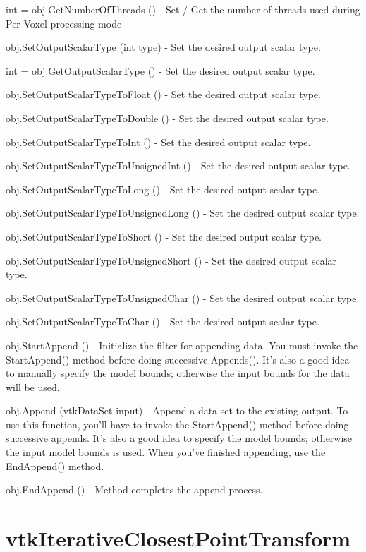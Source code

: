 \begin{DoxyItemize}
\item {\ttfamily int = obj.\-Get\-Number\-Of\-Threads ()} -\/ Set / Get the number of threads used during Per-\/\-Voxel processing mode  
\item {\ttfamily obj.\-Set\-Output\-Scalar\-Type (int type)} -\/ Set the desired output scalar type.  
\item {\ttfamily int = obj.\-Get\-Output\-Scalar\-Type ()} -\/ Set the desired output scalar type.  
\item {\ttfamily obj.\-Set\-Output\-Scalar\-Type\-To\-Float ()} -\/ Set the desired output scalar type.  
\item {\ttfamily obj.\-Set\-Output\-Scalar\-Type\-To\-Double ()} -\/ Set the desired output scalar type.  
\item {\ttfamily obj.\-Set\-Output\-Scalar\-Type\-To\-Int ()} -\/ Set the desired output scalar type.  
\item {\ttfamily obj.\-Set\-Output\-Scalar\-Type\-To\-Unsigned\-Int ()} -\/ Set the desired output scalar type.  
\item {\ttfamily obj.\-Set\-Output\-Scalar\-Type\-To\-Long ()} -\/ Set the desired output scalar type.  
\item {\ttfamily obj.\-Set\-Output\-Scalar\-Type\-To\-Unsigned\-Long ()} -\/ Set the desired output scalar type.  
\item {\ttfamily obj.\-Set\-Output\-Scalar\-Type\-To\-Short ()} -\/ Set the desired output scalar type.  
\item {\ttfamily obj.\-Set\-Output\-Scalar\-Type\-To\-Unsigned\-Short ()} -\/ Set the desired output scalar type.  
\item {\ttfamily obj.\-Set\-Output\-Scalar\-Type\-To\-Unsigned\-Char ()} -\/ Set the desired output scalar type.  
\item {\ttfamily obj.\-Set\-Output\-Scalar\-Type\-To\-Char ()} -\/ Set the desired output scalar type.  
\item {\ttfamily obj.\-Start\-Append ()} -\/ Initialize the filter for appending data. You must invoke the Start\-Append() method before doing successive Appends(). It's also a good idea to manually specify the model bounds; otherwise the input bounds for the data will be used.  
\item {\ttfamily obj.\-Append (vtk\-Data\-Set input)} -\/ Append a data set to the existing output. To use this function, you'll have to invoke the Start\-Append() method before doing successive appends. It's also a good idea to specify the model bounds; otherwise the input model bounds is used. When you've finished appending, use the End\-Append() method.  
\item {\ttfamily obj.\-End\-Append ()} -\/ Method completes the append process.  
\end{DoxyItemize}\hypertarget{vtkhybrid_vtkiterativeclosestpointtransform}{}\section{vtk\-Iterative\-Closest\-Point\-Transform}\label{vtkhybrid_vtkiterativeclosestpointtransform}
